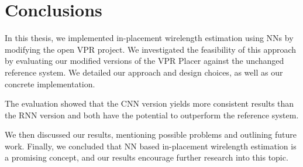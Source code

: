 
\chapter{Conclusions}\label{ch:Conclusions}
\glsresetall %

In this thesis, we implemented in-placement wirelength estimation using \glspl{NN} by modifying the open \gls{VPR} project. We investigated the feasibility of this approach by evaluating our modified versions of the \gls{VPR} Placer against the unchanged reference system. We detailed our approach and design choices, as well as our concrete implementation.

The evaluation showed that the \gls{CNN} version yields more consistent results than the \gls{RNN} version and both have the potential to outperform the reference system. 

We then discussed our results, mentioning possible problems and outlining future work. Finally, we concluded that \gls{NN} based in-\linebreak\noindent placement wirelength estimation is a promising concept, and our results encourage further research into this topic.
